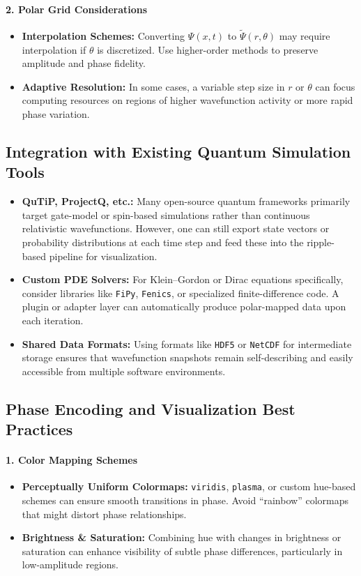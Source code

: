 \documentclass{article}
\begin{document}
\paragraph{2. Polar Grid Considerations}
\begin{itemize}
    \item \textbf{Interpolation Schemes:} Converting \(\Psi(x,t)\) to \(\tilde{\Psi}(r,\theta)\) may require interpolation if \(\theta\) is discretized. Use higher-order methods to preserve amplitude and phase fidelity.
    \item \textbf{Adaptive Resolution:} In some cases, a variable step size in \(r\) or \(\theta\) can focus computing resources on regions of higher wavefunction activity or more rapid phase variation.
\end{itemize}

\subsection{Integration with Existing Quantum Simulation Tools}
\begin{itemize}
    \item \textbf{QuTiP, ProjectQ, etc.:}
    Many open-source quantum frameworks primarily target gate-model or spin-based simulations rather than continuous relativistic wavefunctions. However, one can still export state vectors or probability distributions at each time step and feed these into the ripple-based pipeline for visualization.
    \item \textbf{Custom PDE Solvers:}
    For Klein--Gordon or Dirac equations specifically, consider libraries like \texttt{FiPy}, \texttt{Fenics}, or specialized finite-difference code. A plugin or adapter layer can automatically produce polar-mapped data upon each iteration.
    \item \textbf{Shared Data Formats:}
    Using formats like \texttt{HDF5} or \texttt{NetCDF} for intermediate storage ensures that wavefunction snapshots remain self-describing and easily accessible from multiple software environments.
\end{itemize}

\subsection{Phase Encoding and Visualization Best Practices}

\paragraph{1. Color Mapping Schemes}
\begin{itemize}
    \item \textbf{Perceptually Uniform Colormaps:} \texttt{viridis}, \texttt{plasma}, or custom hue-based schemes can ensure smooth transitions in phase. Avoid “rainbow” colormaps that might distort phase relationships.
    \item \textbf{Brightness \& Saturation:} Combining hue with changes in brightness or saturation can enhance visibility of subtle phase differences, particularly in low-amplitude regions.
\end{itemize}
\end{document}
